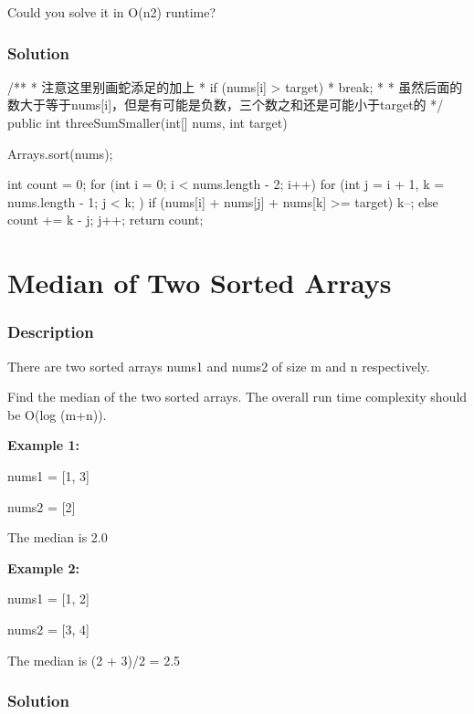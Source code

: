 Could you solve it in O(n2) runtime?

\subsubsection{Solution}

\begin{Code}
/**
 * 注意这里别画蛇添足的加上
 * if (nums[i] > target) {
 *     break;
 * }
 * 虽然后面的数大于等于nums[i]，但是有可能是负数，三个数之和还是可能小于target的
 */
public int threeSumSmaller(int[] nums, int target) {
    Arrays.sort(nums);

    int count = 0;
    for (int i = 0; i < nums.length - 2; i++) {
        for (int j = i + 1, k = nums.length - 1; j < k; ) {
            if (nums[i] + nums[j] + nums[k] >= target) {
                k--;
            } else {
                count += k - j;
                j++;
            }
        }
    }
    return count;
}
\end{Code}

\newpage

\section{Median of Two Sorted Arrays} %

\subsubsection{Description}
There are two sorted arrays nums1 and nums2 of size m and n respectively.

Find the median of the two sorted arrays. The overall run time complexity should be O(log (m+n)).

\textbf{Example 1:}

nums1 = [1, 3]

nums2 = [2]

The median is 2.0

\textbf{Example 2:}

nums1 = [1, 2]

nums2 = [3, 4]

The median is (2 + 3)/2 = 2.5
\subsubsection{Solution}

